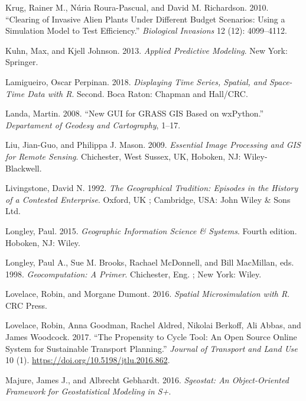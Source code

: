 \documentclass[]{krantz}
\begin{document}
\leavevmode\hypertarget{ref-krug_clearing_2010}{}%
Krug, Rainer M., Núria Roura-Pascual, and David M. Richardson. 2010. ``Clearing of Invasive Alien Plants Under Different Budget Scenarios: Using a Simulation Model to Test Efficiency.'' \emph{Biological Invasions} 12 (12): 4099--4112.

\leavevmode\hypertarget{ref-kuhn_applied_2013}{}%
Kuhn, Max, and Kjell Johnson. 2013. \emph{Applied Predictive Modeling}. New York: Springer.

\leavevmode\hypertarget{ref-lamigueiro_displaying_2018}{}%
Lamigueiro, Oscar Perpinan. 2018. \emph{Displaying Time Series, Spatial, and Space-Time Data with R}. Second. Boca Raton: Chapman and Hall/CRC.

\leavevmode\hypertarget{ref-landa_new_2008}{}%
Landa, Martin. 2008. ``New GUI for GRASS GIS Based on wxPython.'' \emph{Departament of Geodesy and Cartography}, 1--17.

\leavevmode\hypertarget{ref-liu_essential_2009}{}%
Liu, Jian-Guo, and Philippa J. Mason. 2009. \emph{Essential Image Processing and GIS for Remote Sensing}. Chichester, West Sussex, UK, Hoboken, NJ: Wiley-Blackwell.

\leavevmode\hypertarget{ref-livingstone_geographical_1992}{}%
Livingstone, David N. 1992. \emph{The Geographical Tradition: Episodes in the History of a Contested Enterprise}. Oxford, UK ; Cambridge, USA: John Wiley \& Sons Ltd.

\leavevmode\hypertarget{ref-longley_geographic_2015}{}%
Longley, Paul. 2015. \emph{Geographic Information Science \& Systems}. Fourth edition. Hoboken, NJ: Wiley.

\leavevmode\hypertarget{ref-longley_geocomputation_1998}{}%
Longley, Paul A., Sue M. Brooks, Rachael McDonnell, and Bill MacMillan, eds. 1998. \emph{Geocomputation: A Primer}. Chichester, Eng. ; New York: Wiley.

\leavevmode\hypertarget{ref-lovelace_spatial_2016}{}%
Lovelace, Robin, and Morgane Dumont. 2016. \emph{Spatial Microsimulation with R}. CRC Press.

\leavevmode\hypertarget{ref-lovelace_propensity_2017}{}%
Lovelace, Robin, Anna Goodman, Rachel Aldred, Nikolai Berkoff, Ali Abbas, and James Woodcock. 2017. ``The Propensity to Cycle Tool: An Open Source Online System for Sustainable Transport Planning.'' \emph{Journal of Transport and Land Use} 10 (1). \url{https://doi.org/10.5198/jtlu.2016.862}.

\leavevmode\hypertarget{ref-majure_sgeostat_2016}{}%
Majure, James J., and Albrecht Gebhardt. 2016. \emph{Sgeostat: An Object-Oriented Framework for Geostatistical Modeling in S+}.
\end{document}
